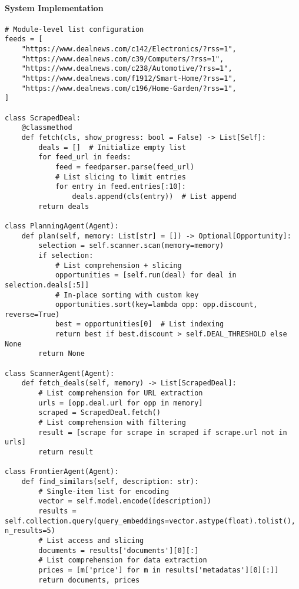 \paragraph{System Implementation}
\begin{lstlisting}[caption=List Usage in Agent System]
# Module-level list configuration
feeds = [
    "https://www.dealnews.com/c142/Electronics/?rss=1",
    "https://www.dealnews.com/c39/Computers/?rss=1",
    "https://www.dealnews.com/c238/Automotive/?rss=1",
    "https://www.dealnews.com/f1912/Smart-Home/?rss=1",
    "https://www.dealnews.com/c196/Home-Garden/?rss=1",
]

class ScrapedDeal:
    @classmethod
    def fetch(cls, show_progress: bool = False) -> List[Self]:
        deals = []  # Initialize empty list
        for feed_url in feeds:
            feed = feedparser.parse(feed_url)
            # List slicing to limit entries
            for entry in feed.entries[:10]:
                deals.append(cls(entry))  # List append
        return deals

class PlanningAgent(Agent):
    def plan(self, memory: List[str] = []) -> Optional[Opportunity]:
        selection = self.scanner.scan(memory=memory)
        if selection:
            # List comprehension + slicing
            opportunities = [self.run(deal) for deal in selection.deals[:5]]
            # In-place sorting with custom key
            opportunities.sort(key=lambda opp: opp.discount, reverse=True)
            best = opportunities[0]  # List indexing
            return best if best.discount > self.DEAL_THRESHOLD else None
        return None

class ScannerAgent(Agent):
    def fetch_deals(self, memory) -> List[ScrapedDeal]:
        # List comprehension for URL extraction
        urls = [opp.deal.url for opp in memory]
        scraped = ScrapedDeal.fetch()
        # List comprehension with filtering
        result = [scrape for scrape in scraped if scrape.url not in urls]
        return result

class FrontierAgent(Agent):
    def find_similars(self, description: str):
        # Single-item list for encoding
        vector = self.model.encode([description])
        results = self.collection.query(query_embeddings=vector.astype(float).tolist(), n_results=5)
        # List access and slicing
        documents = results['documents'][0][:]
        # List comprehension for data extraction
        prices = [m['price'] for m in results['metadatas'][0][:]]
        return documents, prices
\end{lstlisting}

